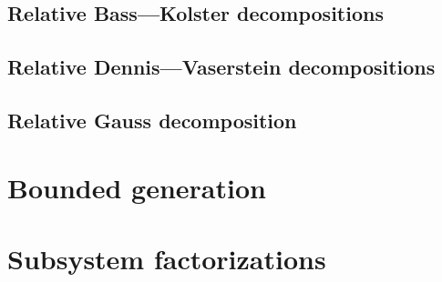 \documentclass[12pt]{amsart}
\numberwithin{equation}{section}
\theoremstyle{definition}
\begin{document}
\subsection{Relative Bass---Kolster decompositions}\label{sec:bass-kolster}

\subsection{Relative Dennis---Vaserstein decompositions}\label{sec:dennis-vaserstein}

\subsection{Relative Gauss decomposition}\label{sec:gauss}


\section{Bounded generation}\label{sec:boundgen}

\section{Subsystem factorizations}\label{sec:subsysfact}


\printbibliography
\end{document}
